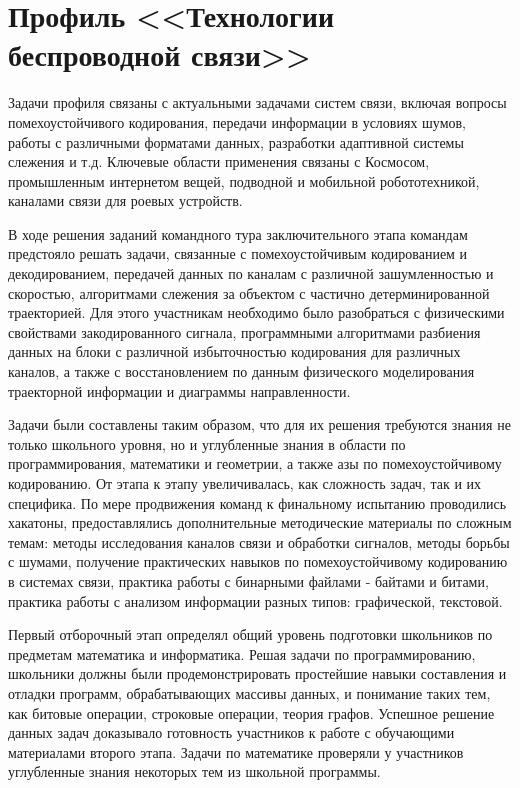 

\chapter{Профиль <<Технологии беспроводной связи>>}

Задачи профиля связаны с актуальными задачами систем связи, включая вопросы помехоустойчивого кодирования, передачи информации в условиях шумов, работы с различными форматами данных, разработки адаптивной системы слежения и т.д. Ключевые области применения связаны с Космосом, промышленным интернетом вещей, подводной и мобильной робототехникой, каналами связи для роевых устройств.

В ходе решения заданий командного тура заключительного этапа командам предстояло решать задачи, связанные с помехоустойчивым кодированием и декодированием, передачей данных по каналам с различной зашумленностью и скоростью, алгоритмами слежения за объектом с частично детерминированной траекторией. Для этого участникам необходимо было разобраться с физическими свойствами закодированного сигнала, программными алгоритмами разбиения данных на блоки с различной избыточностью кодирования для различных каналов, а также с восстановлением по данным физического моделирования траекторной информации и диаграммы направленности.  

Задачи были составлены таким образом, что для их решения требуются знания не только школьного уровня, но и углубленные знания в области по программирования, математики и геометрии, а также азы по помехоустойчивому кодированию. От этапа к этапу увеличивалась, как сложность задач, так и их специфика. По мере продвижения команд к финальному испытанию проводились хакатоны, предоставлялись дополнительные методические материалы по сложным темам: методы исследования каналов связи и обработки сигналов, методы борьбы с шумами, получение практических навыков по помехоустойчивому кодированию в системах связи, практика работы с бинарными файлами - байтами и битами, практика работы с анализом информации разных типов: графической, текстовой.

Первый отборочный этап определял общий уровень подготовки школьников по предметам математика и информатика. Решая задачи по программированию, школьники должны были продемонстрировать простейшие навыки составления и отладки программ, обрабатывающих массивы данных, и понимание таких тем, как битовые операции, строковые операции, теория графов. Успешное решение данных задач доказывало готовность участников к работе с обучающими материалами второго этапа. Задачи по математике проверяли у участников углубленные знания некоторых тем из школьной программы.

